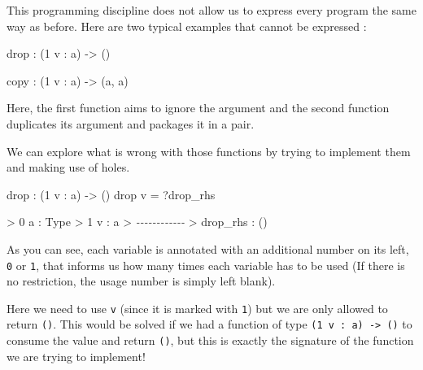 \documentclass[
]{article}
\newenvironment{Shaded}{}{}
\newcommand{\CommentTok}[1]{\textcolor[rgb]{0.38,0.63,0.69}{\textit{#1}}}
\newcommand{\DataTypeTok}[1]{\textcolor[rgb]{0.56,0.13,0.00}{#1}}
\newcommand{\DecValTok}[1]{\textcolor[rgb]{0.25,0.63,0.44}{#1}}
\newcommand{\FunctionTok}[1]{\textcolor[rgb]{0.02,0.16,0.49}{#1}}
\newcommand{\NormalTok}[1]{#1}
\newcommand{\OperatorTok}[1]{\textcolor[rgb]{0.40,0.40,0.40}{#1}}
\newcommand{\OtherTok}[1]{\textcolor[rgb]{0.00,0.44,0.13}{#1}}
\begin{document}
This programming discipline does not allow us to express every program
the same way as before. Here are two typical examples that cannot be
expressed :

\begin{Shaded}
\begin{Highlighting}[]
\FunctionTok{drop} \OperatorTok{:}\NormalTok{ (}\DecValTok{1}\NormalTok{ v }\OperatorTok{:}\NormalTok{ a) }\OtherTok{{-}\textgreater{}}\NormalTok{ ()}

\NormalTok{copy }\OperatorTok{:}\NormalTok{ (}\DecValTok{1}\NormalTok{ v }\OperatorTok{:}\NormalTok{ a) }\OtherTok{{-}\textgreater{}}\NormalTok{ (a, a)}
\end{Highlighting}
\end{Shaded}

Here, the first function aims to ignore the argument and the second
function duplicates its argument and packages it in a pair.

We can explore what is wrong with those functions by trying to implement
them and making use of holes.

\begin{Shaded}
\begin{Highlighting}[]
\FunctionTok{drop} \OperatorTok{:}\NormalTok{ (}\DecValTok{1}\NormalTok{ v }\OperatorTok{:}\NormalTok{ a) }\OtherTok{{-}\textgreater{}}\NormalTok{ ()}
\FunctionTok{drop}\NormalTok{ v }\OtherTok{=} \OperatorTok{?}\NormalTok{drop\_rhs}
\end{Highlighting}
\end{Shaded}

\begin{Shaded}
\begin{Highlighting}[]
\OperatorTok{\textgreater{}} \DecValTok{0}\NormalTok{ a }\OperatorTok{:} \DataTypeTok{Type}
\OperatorTok{\textgreater{}} \DecValTok{1}\NormalTok{ v }\OperatorTok{:}\NormalTok{ a}
\OperatorTok{\textgreater{}} \CommentTok{{-}{-}{-}{-}{-}{-}{-}{-}{-}{-}{-}{-}}
\OperatorTok{\textgreater{}}\NormalTok{ drop\_rhs }\OperatorTok{:}\NormalTok{ ()}
\end{Highlighting}
\end{Shaded}

As you can see, each variable is annotated with an additional number on
its left, \texttt{0} or \texttt{1}, that informs us how many times each
variable has to be used (If there is no restriction, the usage number is
simply left blank).

Here we need to use \texttt{v} (since it is marked with \texttt{1}) but
we are only allowed to return \texttt{()}. This would be solved if we
had a function of type \texttt{(1\ v\ :\ a)\ -\textgreater{}\ ()} to
consume the value and return \texttt{()}, but this is exactly the
signature of the function we are trying to implement!
\end{document}
